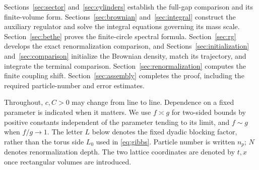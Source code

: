 Sections~\ref{sec:sector} and~\ref{sec:cylinders} establish the full-gap
comparison and its finite-volume form. Sections~\ref{sec:brownian}
and~\ref{sec:integral} construct the auxiliary regulator and solve the
integral equations governing its mass scale. Section~\ref{sec:bethe}
proves the finite-circle spectral formula. Section~\ref{sec:rg} develops
the exact renormalization comparison, and Sections~\ref{sec:initialization}
and~\ref{sec:comparison} initialize the Brownian density, match its
trajectory, and integrate the terminal comparison.
Section~\ref{sec:renormalization} computes the finite coupling shift.
Section~\ref{sec:assembly} completes the proof, including the required
particle-number and error estimates.

Throughout, \(c,C>0\) may change from line to line. Dependence on a fixed
parameter is indicated when it matters. We use \(f\asymp g\) for two-sided
bounds by positive constants independent of the parameter tending to its
limit, and \(f\sim g\) when \(f/g\to1\). The letter \(L\) below denotes
the fixed dyadic blocking factor, rather than the torus side \(L_0\) used
in \eqref{eq:gibbs}. Particle number is written \(n_p\); \(N\) denotes
renormalization depth. The two lattice coordinates are denoted by \(t,x\)
once rectangular volumes are introduced.
